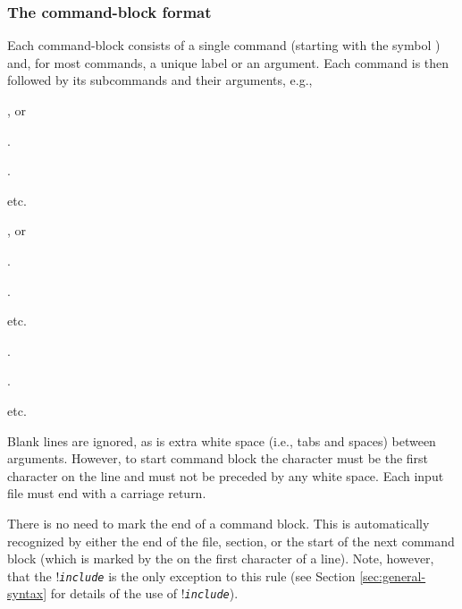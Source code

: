 \subsubsection{The command-block format}
Each command-block consists of a single command (starting with the symbol \command{}) and, for most commands, a unique label or an argument. Each command is then followed by its subcommands and their arguments, e.g., 

\begin{multicols}{3}
	\begin{description}
		\item {}, or
		\item {} 
		\item {} 
		\item .
		\item .
		\item etc.
		\item {} , or
		\item {} 
		\item {} 
		\item .
		\item .
		\item etc.
		\item {} 
		\item {} 
		\item {} 
		\item .
		\item .
		\item etc.
		\end{description}
	\end{multicols}


Blank lines are ignored, as is extra white space (i.e., tabs and spaces) between arguments. However, to start command block the \command{} character must be the first character on the line and must not be preceded by any white space. Each input file must end with a carriage return.

There is no need to mark the end of a command block. This is automatically recognized by either the end of the file, section, or the start of the next command block (which is marked by the \command{} on the first character of a line). Note, however, that the !\texttt{\emph{include}} is the only exception to this rule (see Section \ref{sec:general-syntax} for details of the use of !\texttt{\emph{include}}). 

